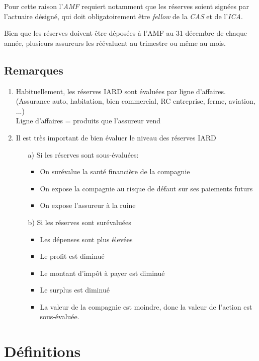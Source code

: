\documentclass[11pt,french]{report}
\begin{document}
Pour cette raison l'\textit{AMF} requiert notamment que les réserves soient signées par l'actuaire désigné, qui doit obligatoirement être \emph{fellow} de la \emph{CAS} et de l'\emph{ICA}.

Bien que les réserves doivent être déposées à l'AMF au 31 décembre de chaque année, plusieurs assureurs les réévaluent au trimestre ou même au mois.

\subsection*{Remarques}
\begin{enumerate}
\item Habituellement, les réserves IARD sont évaluées par ligne d'affaires. (Assurance auto, habitation, bien commercial, RC entreprise, ferme, aviation, ...)
\\
Ligne d'affaires = produits que l'assureur vend
\item Il est très important de bien évaluer le niveau des réserves IARD
	\begin{itemize}
	\item[a)] Si les réserves sont sous-évaluées:
		\begin{itemize}
		\item On surévalue la santé financière de la compagnie
		\item On expose la compagnie au risque de défaut sur ses paiements futurs
		\item On expose l'assureur à la ruine
		\end{itemize}
	\item[b)] Si les réserves sont surévaluées
		\begin{itemize}
		\item Les dépenses sont plus élevées
		\item Le profit est diminué
		\item Le montant d'impôt à payer est diminué
		\item Le surplus est diminué
		\item La valeur de la compagnie est moindre, donc la valeur de l'action est sous-évaluée.
\end{itemize}				
	\end{itemize}
\end{enumerate}

\section{Définitions}
\end{document}
